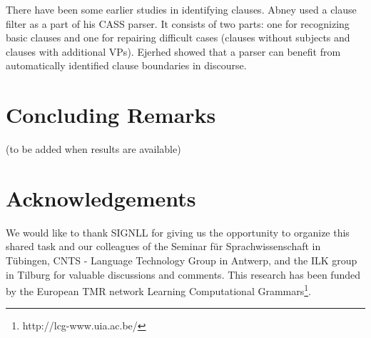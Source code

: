 There have been some earlier studies in identifying clauses.
Abney  used a clause filter as a part of his CASS
parser.
It consists of two parts: one for recognizing basic clauses and one 
for repairing difficult cases (clauses without subjects and clauses
with additional VPs).
Ejerhed  showed that a parser can benefit from
automatically identified clause boundaries in discourse.

\section{Concluding Remarks}

(to be added when results are available)

\section*{Acknowledgements}

We would like to thank SIGNLL for giving us the opportunity to
organize this shared task and our colleagues of
the Seminar f\"ur Sprachwissenschaft in T\"ubingen,
CNTS - Language Technology Group in Antwerp, and 
the ILK group in Tilburg for valuable discussions and comments.
This research has been funded by the European TMR network
Learning Computational Grammars\footnote{http://lcg-www.uia.ac.be/}.

\small



